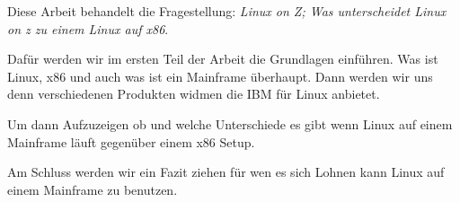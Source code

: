 Diese Arbeit behandelt die Fragestellung: 
{\it Linux on Z; Was unterscheidet Linux on z zu einem Linux auf x86}.

Dafür werden wir im ersten Teil der Arbeit die Grundlagen einführen.
Was ist Linux, x86 und auch was ist ein Mainframe überhaupt. 
Dann werden wir uns denn verschiedenen Produkten widmen die IBM 
für Linux anbietet. 

Um dann Aufzuzeigen ob und welche Unterschiede es gibt wenn Linux auf einem
Mainframe läuft gegenüber einem x86 Setup.

Am Schluss werden wir ein Fazit ziehen für wen es sich Lohnen kann Linux auf
einem Mainframe zu benutzen.